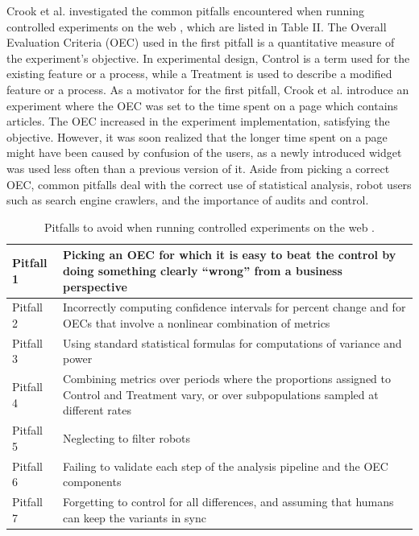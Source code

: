\documentclass[english]{tktltiki2}
\theoremstyle{definition}
\theoremstyle{remark}
\begin{document}
Crook et al. investigated the common pitfalls encountered when running controlled experiments on the web \cite{crook2009seven}, which are listed in Table II. The Overall Evaluation Criteria (OEC) used in the first pitfall is a quantitative measure of the experiment's objective. In experimental design, Control is a term used for the existing feature or a process, while a Treatment is used to describe a modified feature or a process. As a motivator for the first pitfall, Crook et al. introduce an experiment where the OEC was set to the time spent on a page which contains articles. The OEC increased in the experiment implementation, satisfying the objective. However, it was soon realized that the longer time spent on a page might have been caused by confusion of the users, as a newly introduced widget was used less often than a previous version of it. Aside from picking a correct OEC, common pitfalls deal with the correct use of statistical analysis, robot users such as search engine crawlers, and the importance of audits and control.
\begin{center}
\begin{table}[htb]
    \begin{tabular}{ | p{2cm} | p{10cm} |}
    \hline
	Pitfall 1 & Picking an OEC for which it is easy to beat the control by doing something clearly “wrong” from a business perspective \\ \hline
	Pitfall 2 & Incorrectly computing confidence intervals for percent change and for OECs that involve a nonlinear combination of metrics \\ \hline
	Pitfall 3 & Using standard statistical formulas for computations of variance and power \\ \hline
	Pitfall 4 & Combining metrics over periods where the proportions assigned to Control and Treatment vary, or over subpopulations sampled at different rates \\ \hline
	Pitfall 5 & Neglecting to filter robots \\ \hline
	Pitfall 6 & Failing to validate each step of the analysis pipeline and the OEC components \\ \hline
	Pitfall 7 & Forgetting to control for all differences, and assuming that humans can keep the variants in sync \\ \hline
    \end{tabular}
    \caption{Pitfalls to avoid when running controlled experiments on the web \cite{crook2009seven}.}
    \end{table}
\end{center}
\end{document}

